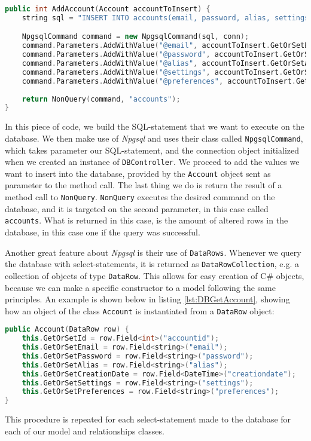 \begin{lstlisting}[language=c++, caption=Adding a new Account to the Database, label={lst:DBAddAccount}]
public int AddAccount(Account accountToInsert) {
	string sql = "INSERT INTO accounts(email, password, alias, settings, preferences) VALUES (@email, @password, @alias, @settings, @preferences)";

	NpgsqlCommand command = new NpgsqlCommand(sql, conn);
	command.Parameters.AddWithValue("@email", accountToInsert.GetOrSetEmail);
	command.Parameters.AddWithValue("@password", accountToInsert.GetOrSetPassword);
	command.Parameters.AddWithValue("@alias", accountToInsert.GetOrSetAlias);
	command.Parameters.AddWithValue("@settings", accountToInsert.GetOrSetSettings);
	command.Parameters.AddWithValue("@preferences", accountToInsert.GetOrSetPreferences);
	
	return NonQuery(command, "accounts");
}
\end{lstlisting}

In this piece of code, we build the SQL-statement that we want to execute on the database. We then make use of \textit{Npgsql} and uses their class called \texttt{NpgsqlCommand}, which takes parameter our SQL-statement, and the connection object initialized when we created an instance of \texttt{DBController}. We proceed to add the values we want to insert into the database, provided by the \texttt{Account} object sent as parameter to the method call. The last thing we do is return the result of a method call to \texttt{NonQuery}. \texttt{NonQuery} executes the desired command on the database, and it is targeted on the second parameter, in this case called \texttt{accounts}. What is returned in this case, is the amount of altered rows in the database, in this case one if the query was successful.

Another great feature about \textit{Npgsql} is their use of \texttt{DataRows}\cite{datarow}. Whenever we query the database with select-statements, it is returned as \texttt{DataRowCollection}, e.g. a collection of objects of type \texttt{DataRow}. This allows for easy creation of C\# objects, because we can make a specific constructor to a model following the same principles. An example is shown below in listing \ref{lst:DBGetAccount}, showing how an object of the class \texttt{Account} is instantiated from a \texttt{DataRow} object:

\begin{lstlisting}[language=c++, caption=Instantiating a new Account-object from a DataRow-object, label={lst:DBGetAccount}]
public Account(DataRow row) {
	this.GetOrSetId = row.Field<int>("accountid");
	this.GetOrSetEmail = row.Field<string>("email");
	this.GetOrSetPassword = row.Field<string>("password");
	this.GetOrSetAlias = row.Field<string>("alias");
	this.GetOrSetCreationDate = row.Field<DateTime>("creationdate");
	this.GetOrSetSettings = row.Field<string>("settings");
	this.GetOrSetPreferences = row.Field<string>("preferences");
}
\end{lstlisting}

This procedure is repeated for each select-statement made to the database for each of our model and relationships classes.


